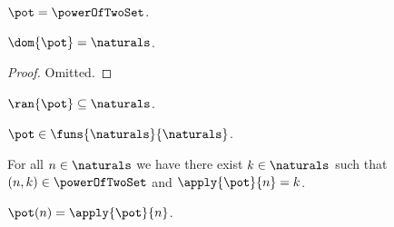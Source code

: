 \begin{abbreviation}\label{pot}
    $\pot = \powerOfTwoSet$.
\end{abbreviation}

\begin{lemma}\label{dom_pot}
    $\dom{\pot} = \naturals$.
\end{lemma}
\begin{proof}
    Omitted.
\end{proof}

\begin{lemma}\label{ran_pot}
    $\ran{\pot} \subseteq \naturals$.
\end{lemma}


\begin{axiom}\label{pot1}
    $\pot \in \funs{\naturals}{\naturals}$.
\end{axiom}

\begin{axiom}\label{pot2} 
    For all $n \in \naturals$ we have there exist $k\in \naturals$ such that $(n, k) \in \powerOfTwoSet$ and $\apply{\pot}{n}=k$.
\end{axiom}


\begin{abbreviation}\label{pot_as_function}
    $\pot(n) = \apply{\pot}{n}$.
\end{abbreviation}


